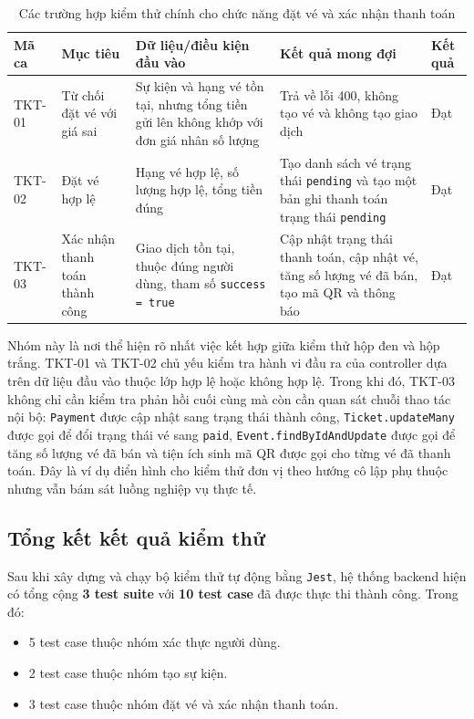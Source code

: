 \documentclass[../DoAn.tex]{subfiles}
\begin{document}
\begin{table}[H]
\centering
\footnotesize
\renewcommand{\arraystretch}{1.3}
\begin{tabular}{|p{1.8cm}|p{3.4cm}|p{3.9cm}|p{3.9cm}|p{1.7cm}|}
\hline
\textbf{Mã ca} & \textbf{Mục tiêu} & \textbf{Dữ liệu/điều kiện đầu vào} & \textbf{Kết quả mong đợi} & \textbf{Kết quả} \\ \hline
TKT-01 & Từ chối đặt vé với giá sai & Sự kiện và hạng vé tồn tại, nhưng tổng tiền gửi lên không khớp với đơn giá nhân số lượng & Trả về lỗi 400, không tạo vé và không tạo giao dịch & Đạt \\ \hline
TKT-02 & Đặt vé hợp lệ & Hạng vé hợp lệ, số lượng hợp lệ, tổng tiền đúng & Tạo danh sách vé trạng thái \texttt{pending} và tạo một bản ghi thanh toán trạng thái \texttt{pending} & Đạt \\ \hline
TKT-03 & Xác nhận thanh toán thành công & Giao dịch tồn tại, thuộc đúng người dùng, tham số \texttt{success = true} & Cập nhật trạng thái thanh toán, cập nhật vé, tăng số lượng vé đã bán, tạo mã \gls{QR} và thông báo & Đạt \\ \hline
\end{tabular}
\caption{Các trường hợp kiểm thử chính cho chức năng đặt vé và xác nhận thanh toán}
\label{tab:test-ticket}
\end{table}

Nhóm này là nơi thể hiện rõ nhất việc kết hợp giữa kiểm thử hộp đen và hộp trắng. TKT-01 và TKT-02 chủ yếu kiểm tra hành vi đầu ra của controller dựa trên dữ liệu đầu vào thuộc lớp hợp lệ hoặc không hợp lệ. Trong khi đó, TKT-03 không chỉ cần kiểm tra phản hồi cuối cùng mà còn cần quan sát chuỗi thao tác nội bộ: \texttt{Payment} được cập nhật sang trạng thái thành công, \texttt{Ticket.updateMany} được gọi để đổi trạng thái vé sang \texttt{paid}, \texttt{Event.findByIdAndUpdate} được gọi để tăng số lượng vé đã bán và tiện ích sinh mã \gls{QR} được gọi cho từng vé đã thanh toán. Đây là ví dụ điển hình cho kiểm thử đơn vị theo hướng cô lập phụ thuộc nhưng vẫn bám sát luồng nghiệp vụ thực tế.

\subsection{Tổng kết kết quả kiểm thử}
Sau khi xây dựng và chạy bộ kiểm thử tự động bằng \texttt{Jest}, hệ thống backend hiện có tổng cộng \textbf{3 test suite} với \textbf{10 test case} đã được thực thi thành công. Trong đó:

\begin{itemize}
    \item 5 test case thuộc nhóm xác thực người dùng.
    \item 2 test case thuộc nhóm tạo sự kiện.
    \item 3 test case thuộc nhóm đặt vé và xác nhận thanh toán.
\end{itemize}
\end{document}
